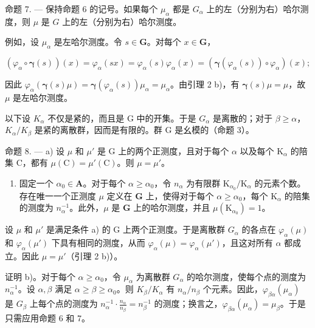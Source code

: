 命题 7. --- 保持命题 6 的记号。如果每个 \(\mu_{\alpha}\) 都是 \(G_{\alpha}\) 上的左（分别为右）哈尔测度，则 \(\mu\) 是 \(G\) 上的左（分别为右）哈尔测度。

例如，设 \(\mu_{\alpha}\) 是左哈尔测度。令 \(s \in \mathbf{G}\)。对每个 \(x \in \mathbf{G}\)，

\[
\left(\varphi_ {\alpha} \circ \boldsymbol {\gamma} (s)\right) (x) = \varphi_ {\alpha} (s x) = \varphi_ {\alpha} (s) \varphi_ {\alpha} (x) = \left(\boldsymbol {\gamma} (\varphi_ {\alpha} (s)) \circ \varphi_ {\alpha}\right) (x);
\]

因此 \(\varphi_{\alpha}(\pmb{\gamma}(s)\mu) = \pmb{\gamma}(\varphi_{\alpha}(s))\mu_{\alpha} = \mu_{\alpha}\)。由引理 2 b)，有 \(\pmb{\gamma}(s)\mu = \mu\)，故 \(\mu\) 是左哈尔测度。

以下设 \(K_{\alpha}\) 不仅是紧的，而且是 G 中的开集。于是 \(G_{\alpha}\) 是离散的；对于 \(\beta \geqslant \alpha\)，\(K_{\alpha}/K_{\beta}\) 是紧的离散群，因而是有限的。群 G 是幺模的（命题 3）。

命题 8. --- a) 设 \(\mu\) 和 \(\mu'\) 是 G 上的两个正测度，且对于每个 \(\alpha\) 以及每个 \(\mathrm{K}_{\alpha}\) 的陪集 C，都有 \(\mu(\mathrm{C}) = \mu'(\mathrm{C})\)。则 \(\mu = \mu'\)。

\begin{enumerate}
\def\labelenumi{\alph{enumi})}
\setcounter{enumi}{1}
\tightlist
\item
  固定一个 \(\alpha_0 \in \mathbf{A}\)。对于每个 \(\alpha \geqslant \alpha_0\)，令 \(n_{\alpha}\) 为有限群 \(\mathrm{K}_{\alpha_0} / \mathrm{K}_{\alpha}\) 的元素个数。存在唯一一个正测度 \(\mu\) 定义在 \(\mathbf{G}\) 上，使得对于每个 \(\alpha \geqslant \alpha_0\)，每个 \(\mathrm{K}_{\alpha}\) 的陪集的测度为 \(n_{\alpha}^{-1}\)。此外，\(\mu\) 是 \(\mathbf{G}\) 上的哈尔测度，并且 \(\mu(\mathrm{K}_{\alpha_0}) = 1\)。
\end{enumerate}

设 \(\mu\) 和 \(\mu'\) 是满足条件 a) 的 G 上两个正测度。于是离散群 \(G_{\alpha}\) 的各点在 \(\varphi_{\alpha}(\mu)\) 和 \(\varphi_{\alpha}(\mu')\) 下具有相同的测度，从而 \(\varphi_{\alpha}(\mu) = \varphi_{\alpha}(\mu')\)，且这对所有 \(\alpha\) 都成立。因此 \(\mu = \mu'\)（引理 2 b)）。

证明 b)。对于每个 \(\alpha \geqslant \alpha_0\)，令 \(\mu_{\alpha}\) 为离散群 \(G_{\alpha}\) 的哈尔测度，使每个点的测度为 \(n_{\alpha}^{-1}\)。设 \(\alpha, \beta\) 满足 \(\alpha \geqslant \beta \geqslant \alpha_0\)。则 \(K_{\beta}/K_{\alpha}\) 有 \(n_{\alpha}/n_{\beta}\) 个元素。因此，\(\varphi_{\beta\alpha}(\mu_{\alpha})\) 是 \(G_{\beta}\) 上每个点的测度为 \(n_{\alpha}^{-1} \cdot \frac{n_{\alpha}}{n_{\beta}} = n_{\beta}^{-1}\) 的测度；换言之，\(\varphi_{\beta\alpha}(\mu_{\alpha}) = \mu_{\beta}\)。于是只需应用命题 6 和 7。

